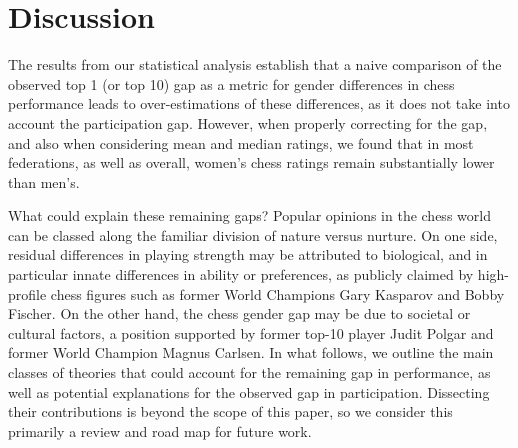 \documentclass[9pt,twocolumn,twoside,lineno]{pnas-new}
\begin{document}
\section*{Discussion}

The results from our statistical analysis establish that a naive comparison of the observed top 1 (or top 10) gap as a metric for gender differences in chess performance leads to over-estimations of these differences, as it does not take into account the participation gap. However, when properly correcting for the gap, and also when considering mean and median ratings, we found that in most federations, as well as overall, women's chess ratings remain substantially lower than men's. 

What could explain these remaining gaps? Popular opinions in the chess world can be classed along the familiar division of nature versus nurture. On one side, residual differences in playing strength may be attributed to biological, and in particular innate differences in ability or preferences, as publicly claimed by high-profile chess figures such as former World Champions Gary Kasparov and Bobby Fischer. On the other hand, the chess gender gap may be due to societal or cultural factors, a position supported by former top-10 player Judit Polgar and former World Champion Magnus Carlsen. In what follows, we outline the main classes of theories that could account for the remaining gap in performance, as well as potential explanations for the observed gap in participation. Dissecting their contributions is beyond the scope of this paper, so we consider this primarily a review and road map for future work.




\end{document}
